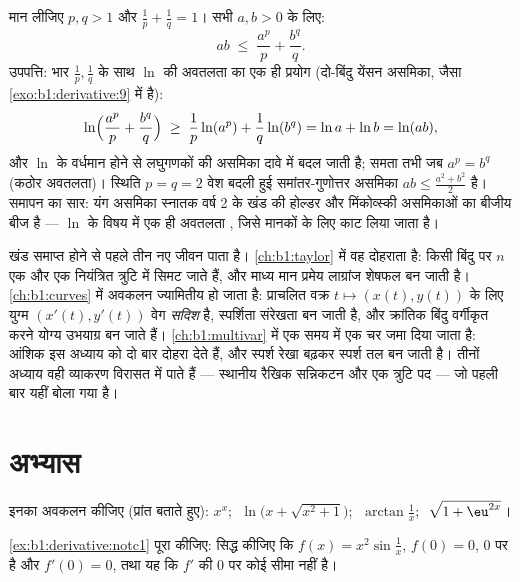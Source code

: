 \begin{example}\label{ex:b1:derivative:young}
मान लीजिए $p, q > 1$ और $\frac1p + \frac1q = 1$। सभी $a, b > 0$ के लिए:
\[
ab \;\leq\; \frac{a^p}{p} + \frac{b^q}{q} .
\]
उपपत्ति: भार $\frac1p, \frac1q$ के साथ $\ln$ की अवतलता का एक ही प्रयोग
(दो-बिंदु येंसन असमिका, जैसा \cref{exo:b1:derivative:9} में है):
\[
\ln\Bigl(\frac{a^p}{p} + \frac{b^q}{q}\Bigr)
\;\geq\; \frac1p \ln(a^p) + \frac1q \ln(b^q)
= \ln a + \ln b = \ln(ab),
\]
और $\ln$ के वर्धमान होने से लघुगणकों की असमिका दावे में बदल जाती है; समता
तभी जब $a^p = b^q$ (कठोर अवतलता)। स्थिति $p = q = 2$ वेश बदली हुई
समांतर-गुणोत्तर असमिका $ab \leq \frac{a^2 + b^2}{2}$ है। समापन का सार: यंग
असमिका स्नातक वर्ष 2 के खंड की होल्डर और मिंकोव्स्की असमिकाओं का बीजीय बीज
है --- $\ln$ के विषय में एक ही अवतलता , जिसे मानकों के लिए काट लिया जाता
है।
\end{example}

\begin{remark}[इस खंड के भीतर आगे की दृष्टि]
खंड समाप्त होने से पहले  तीन नए जीवन पाता है। \cref{ch:b1:taylor} में
वह दोहराता है: किसी बिंदु पर $n$  एक  और एक नियंत्रित त्रुटि में
सिमट जाते हैं, और माध्य मान प्रमेय लाग्रांज शेषफल बन जाती है।
\cref{ch:b1:curves} में अवकलन ज्यामितीय हो जाता है: प्राचलित वक्र $t \mapsto
(x(t), y(t))$ के लिए युग्म $(x'(t), y'(t))$ वेग \emph{सदिश} है, स्पर्शिता
संरेखता बन जाती है, और क्रांतिक बिंदु वर्गीकृत करने योग्य उभयाग्र बन जाते
हैं। \cref{ch:b1:multivar} में एक समय में एक चर जमा दिया जाता है: आंशिक
 इस अध्याय को दो बार दोहरा देते हैं, और स्पर्श रेखा बढ़कर स्पर्श तल बन
जाती है। तीनों अध्याय वही व्याकरण विरासत में पाते हैं --- स्थानीय रैखिक
सन्निकटन और एक त्रुटि पद --- जो पहली बार यहीं बोला गया है।
\end{remark}

\section{अभ्यास}

\begin{exercise}[$\star$]\label{exo:b1:derivative:1}
इनका अवकलन कीजिए (प्रांत बताते हुए): $x^x$; $\;\ln\bigl(x +
\sqrt{x^2+1}\bigr)$; $\;\arctan\frac{1}{x}$; $\;\sqrt{1 + \eu^{2x}}$।
\end{exercise}

\begin{exercise}[$\star$]\label{exo:b1:derivative:2}
\cref{ex:b1:derivative:notc1} पूरा कीजिए: सिद्ध कीजिए कि $f(x) = x^2
\sin\frac1x$, $f(0) = 0$, $0$ पर  है और $f'(0) = 0$, तथा यह कि $f'$
की $0$ पर कोई सीमा नहीं है।
\end{exercise}


